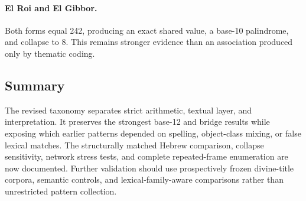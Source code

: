 \paragraph{El Roi and El Gibbor.}
Both forms equal 242, producing an exact shared value, a base-10 palindrome, and collapse to 8. This remains stronger evidence than an association produced only by thematic coding.

\subsection{Summary}

The revised taxonomy separates strict arithmetic, textual layer, and interpretation. It preserves the strongest base-12 and bridge results while exposing which earlier patterns depended on spelling, object-class mixing, or false lexical matches. The structurally matched Hebrew comparison, collapse sensitivity, network stress tests, and complete repeated-frame enumeration are now documented. Further validation should use prospectively frozen divine-title corpora, semantic controls, and lexical-family-aware comparisons rather than unrestricted pattern collection.
